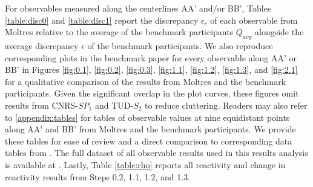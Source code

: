 For observables measured along the centerlines AA' and/or BB', Tables
\ref{table:disc0} and \ref{table:disc1} report the discrepancy $\epsilon_c$ of
each observable from Moltres relative to the average of the benchmark
participants $Q_{avg}$ alongside the average discrepancy $\epsilon$ of
the benchmark participants. We also reproduce corresponding plots
in the benchmark paper for every observable along AA' or BB' in Figures
\ref{fig:0.1}, \ref{fig:0.2}, \ref{fig:0.3}, \ref{fig:1.1}, \ref{fig:1.2},
\ref{fig:1.3}, and \ref{fig:2.1} for a qualitative comparison of the results
from Moltres and the benchmark participants. Given the significant overlap in
the plot curves, these figures omit results from CNRS-$SP_1$ and TUD-$S_2$ to
reduce cluttering. Readers may also refer to
\ref{appendix:tables} for tables of observable values at nine equidistant
points along AA' and BB' from Moltres and the benchmark participants. We
provide these tables for ease of review and a direct comparison to
corresponding data tables from \cite{tiberga_results_2020}. The full dataset
of all observable results used in this results analysis is
available at \cite{park_results_2021}. Lastly, Table
\ref{table:rho} reports all reactivity and change in reactivity results from
Steps 0.2, 1.1, 1.2, and 1.3.

